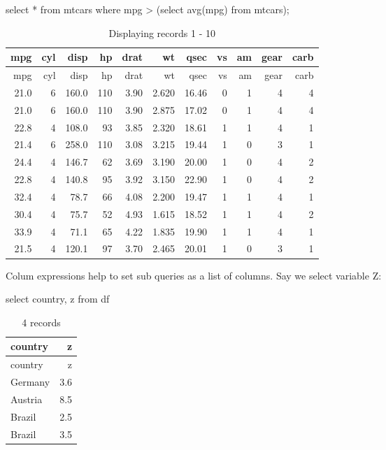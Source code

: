 \documentclass[
  letterpaper,
  DIV=11,
  numbers=noendperiod]{scrreprt}
\newenvironment{Shaded}{\begin{snugshade}}{\end{snugshade}}
\newcommand{\FunctionTok}[1]{\textcolor[rgb]{0.28,0.35,0.67}{#1}}
\newcommand{\KeywordTok}[1]{\textcolor[rgb]{0.00,0.23,0.31}{#1}}
\newcommand{\NormalTok}[1]{\textcolor[rgb]{0.00,0.23,0.31}{#1}}
\newcommand{\OperatorTok}[1]{\textcolor[rgb]{0.37,0.37,0.37}{#1}}
\begin{document}
\begin{Shaded}
\begin{Highlighting}[]
\KeywordTok{select} \OperatorTok{*} \KeywordTok{from}\NormalTok{ mtcars }\KeywordTok{where}\NormalTok{ mpg }\OperatorTok{\textgreater{}}
\NormalTok{  (}\KeywordTok{select} \FunctionTok{avg}\NormalTok{(mpg) }\KeywordTok{from}\NormalTok{ mtcars);}
\end{Highlighting}
\end{Shaded}

\begin{longtable}[]{@{}rrrrrrrrrrr@{}}
\caption{Displaying records 1 - 10}\tabularnewline
\toprule()
mpg & cyl & disp & hp & drat & wt & qsec & vs & am & gear & carb \\
\midrule()
\endfirsthead
\toprule()
mpg & cyl & disp & hp & drat & wt & qsec & vs & am & gear & carb \\
\midrule()
\endhead
21.0 & 6 & 160.0 & 110 & 3.90 & 2.620 & 16.46 & 0 & 1 & 4 & 4 \\
21.0 & 6 & 160.0 & 110 & 3.90 & 2.875 & 17.02 & 0 & 1 & 4 & 4 \\
22.8 & 4 & 108.0 & 93 & 3.85 & 2.320 & 18.61 & 1 & 1 & 4 & 1 \\
21.4 & 6 & 258.0 & 110 & 3.08 & 3.215 & 19.44 & 1 & 0 & 3 & 1 \\
24.4 & 4 & 146.7 & 62 & 3.69 & 3.190 & 20.00 & 1 & 0 & 4 & 2 \\
22.8 & 4 & 140.8 & 95 & 3.92 & 3.150 & 22.90 & 1 & 0 & 4 & 2 \\
32.4 & 4 & 78.7 & 66 & 4.08 & 2.200 & 19.47 & 1 & 1 & 4 & 1 \\
30.4 & 4 & 75.7 & 52 & 4.93 & 1.615 & 18.52 & 1 & 1 & 4 & 2 \\
33.9 & 4 & 71.1 & 65 & 4.22 & 1.835 & 19.90 & 1 & 1 & 4 & 1 \\
21.5 & 4 & 120.1 & 97 & 3.70 & 2.465 & 20.01 & 1 & 0 & 3 & 1 \\
\bottomrule()
\end{longtable}

Colum expressions help to set sub queries as a list of columns. Say we
select variable Z:

\begin{Shaded}
\begin{Highlighting}[]
\KeywordTok{select}\NormalTok{ country, z }\KeywordTok{from}\NormalTok{ df}
\end{Highlighting}
\end{Shaded}

\begin{longtable}[]{@{}lr@{}}
\caption{4 records}\tabularnewline
\toprule()
country & z \\
\midrule()
\endfirsthead
\toprule()
country & z \\
\midrule()
\endhead
Germany & 3.6 \\
Austria & 8.5 \\
Brazil & 2.5 \\
Brazil & 3.5 \\
\bottomrule()
\end{longtable}
\end{document}
